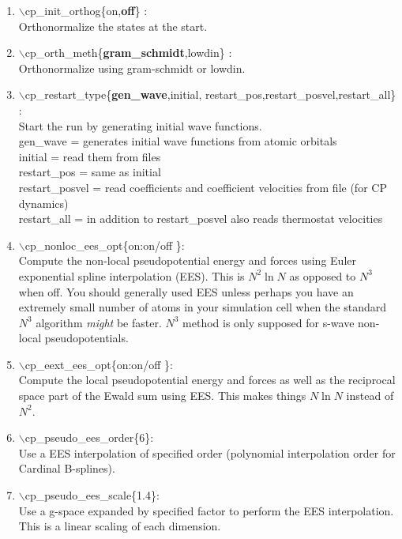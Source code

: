 \documentclass[12pt,titlepage]{article}
\begin{document}
\begin{enumerate}
 
 \vspace{0.15in} 
 \item  $\backslash$cp\_init\_orthog\{on,{\bf off}\} : \\
      Orthonormalize the states at the start.

 \vspace{0.15in} 
 \item  $\backslash$cp\_orth\_meth\{{\bf gram\_schmidt},lowdin\} : \\
      Orthonormalize using gram-schmidt or lowdin.

 \vspace{0.15in} 
 \item  $\backslash$cp\_restart\_type\{{\bf gen\_wave},initial,
                         restart\_pos,restart\_posvel,restart\_all\} : \\
      Start the run by generating initial wave functions.\\
      gen\_wave = generates initial wave functions from atomic orbitals\\
      initial = read them from files\\
      restart\_pos = same as initial  \\
      restart\_posvel = read coefficients and coefficient velocities from file (for CP dynamics)\\
      restart\_all = in addition to restart\_posvel also reads thermostat velocities
      

 \vspace{0.15in} 
 \item  $\backslash$cp\_nonloc\_ees\_opt\{on:on/off \}: \\     
 Compute the non-local pseudopotential energy and forces using Euler
 exponential spline interpolation (EES).  This is $N^2\ln N$ as opposed to $N^3$ when off.
 You should generally used EES unless perhaps you have an extremely small number of atoms
 in your simulation cell when the standard $N^3$ algorithm {\it might} be faster.  $N^3$ method is
 only supposed for s-wave non-local pseudopotentials.

 \vspace{0.15in} 
 \item  $\backslash$cp\_eext\_ees\_opt\{on:on/off \}: \\     
     Compute the local pseudopotential energy and forces as well as the 
     reciprocal space part of the Ewald sum using  EES.  This makes things $N\ln N$ instead of $N^2$.

 \vspace{0.15in} 
 \item  $\backslash$cp\_pseudo\_ees\_order\{6\}: \\     
     Use a EES interpolation of specified order (polynomial interpolation order for Cardinal B-splines).

 \vspace{0.15in} 
 \item  $\backslash$cp\_pseudo\_ees\_scale\{1.4\}: \\     
     Use a g-space expanded by specified factor to perform the EES interpolation.  This is a linear scaling of each dimension.
\end{enumerate}
\end{document}
